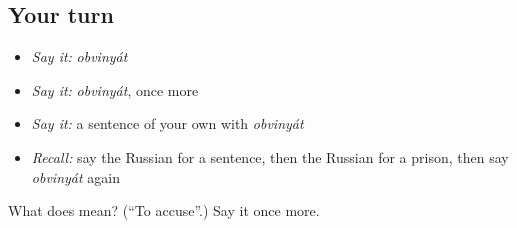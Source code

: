 \subsection*{Your turn}
\begin{itemize}
\raggedright
  \item \emph{Say it:} \emph{obvinyát}
  \item \emph{Say it:} \emph{obvinyát}, once more
  \item \emph{Say it:} a sentence of your own with \emph{obvinyát}
  \item \emph{Recall:} say the Russian for a sentence, then the Russian for a prison, then say \emph{obvinyát} again
\end{itemize}

\begin{tcolorbox}[breakable,colback=teal!4,colframe=teal!35!black,title={Before you move on}]
What does  mean? (\textquotedblleft{}To accuse\textquotedblright{}.) Say it once more.
\end{tcolorbox}
